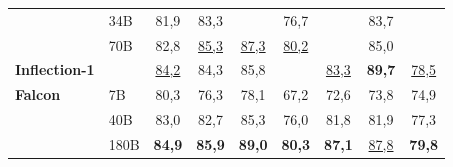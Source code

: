 \documentclass{article}
\begin{document}
\begin{table}[t]
\begin{tabular}{llccccccc}
\textbf{}             & 34B  & 81,9          & 83,3            &                      & 76,7             &                      & 83,7           &                  \\
\textbf{}             & 70B  & 82,8          & \underline{85,3}            & \underline{87,3}                 & \underline{80,2}    &                      & 85,0           &                  \\
\textbf{Inflection-1} &      & \underline{84,2}          & 84,3            & 85,8                 &                  & \underline{83,3}                 & \textbf{89,7}  & \underline{78,5}             \\ \midrule
\textbf{Falcon}       & 7B   & 80,3          & 76,3            & 78,1                 & 67,2             & 72,6                 & 73,8           & 74,9             \\
\textbf{}             & 40B  & 83,0          & 82,7            & 85,3                 & 76,0             & 81,8                 & 81,9           & 77,3             \\
\textbf{}             & 180B & \textbf{84,9} & \textbf{85,9}   & \textbf{89,0}        & \textbf{80,3}    & \textbf{87,1}        & \underline{87,8}           & \textbf{79,8}   \\ \bottomrule
\end{tabular}
\end{table}
\end{document}
